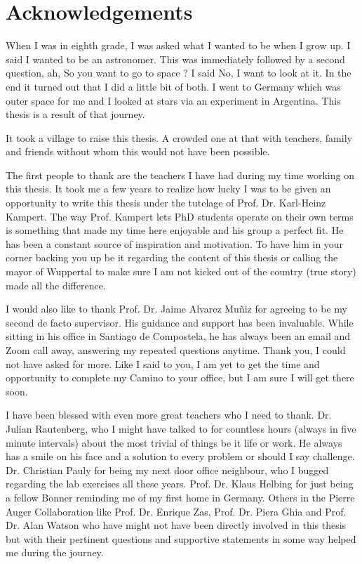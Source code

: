\chapter*{Acknowledgements}
\label{sec:ack}
When I was in eighth grade, I was asked what I wanted to be when I grow up. I said I wanted to be an astronomer. This was immediately followed by a second question, ah, So you want to go to space ? I said No, I want to look at it. In the end it turned out that I did a little bit of both. I went to Germany which was outer space for me and I looked at stars via an experiment in Argentina. This thesis is a result of that journey.

It took a village to raise this thesis. A crowded one at that with teachers, family and friends without whom this would not have been possible.

The first people to thank are the teachers I have had during my time working on this thesis. It took me a few years to realize how lucky I was to be given an opportunity to write this thesis under the tutelage of Prof. Dr. Karl-Heinz Kampert. The way Prof. Kampert lets PhD students operate on their own terms is something that made my time here enjoyable and his group a perfect fit. He has been a constant source of inspiration and motivation. To have him in your corner backing you up be it regarding the content of this thesis or calling the mayor of Wuppertal to make sure I am not kicked out of the country (true story) made all the difference. 

I would also like to thank Prof. Dr. Jaime Alvarez Muñiz for agreeing to be my second de facto supervisor. His guidance and support has been invaluable. While sitting in his office in Santiago de Compostela, he has always been an email and Zoom call away, answering my repeated questions anytime. Thank you, I could not have asked for more. Like I said to you, I am yet to get the time and opportunity to complete my Camino to your office, but I am sure I will get there soon. 

I have been blessed with even more great teachers who I need to thank. Dr. Julian Rautenberg, who I might have talked to for countless hours (always in five minute intervals) about the most trivial of things be it life or work. He always has a smile on his face and a solution to every problem or should I say challenge. Dr. Christian Pauly for being my next door office neighbour, who I bugged regarding the lab exercises all these years. Prof. Dr. Klaus Helbing for just being a fellow Bonner reminding me of my first home in Germany. Others in the Pierre Auger Collaboration like Prof. Dr. Enrique Zas, Prof. Dr. Piera Ghia and Prof. Dr. Alan Watson who have might not have been directly involved in this thesis but with their pertinent questions and supportive statements in some way helped me during the journey.

